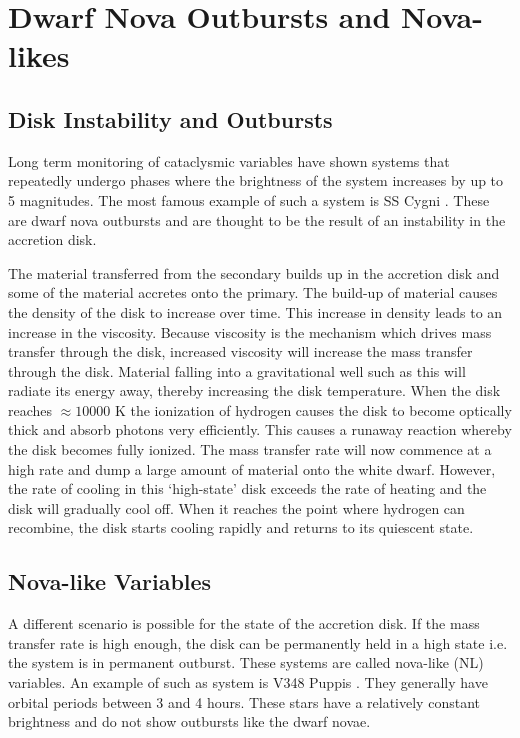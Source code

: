 \section{Dwarf Nova Outbursts and Nova-likes }

\subsection{Disk Instability and Outbursts}

Long term monitoring of cataclysmic variables have shown systems that repeatedly undergo phases where the brightness of the system increases by up to 5 magnitudes. The most famous example of such a system is SS Cygni \citep{SSCyg}. These are dwarf nova outbursts and are thought to be the result of an instability in the accretion disk. 

The material transferred from the secondary builds up in the accretion disk and some of the material accretes onto the primary. The build-up of material causes the density of the disk to increase over time. This increase in density leads to an increase in the viscosity. Because viscosity is the mechanism which drives mass transfer through the disk, increased viscosity will increase the mass transfer through the disk. Material falling into a gravitational well such as this will radiate its energy away, thereby increasing the disk temperature. When the disk reaches $\approx 10000$ K the ionization of hydrogen causes the disk to become optically thick and absorb photons very efficiently. This causes a runaway reaction whereby the disk becomes fully ionized. The mass transfer rate will now commence at a high rate and dump a large amount of material onto the white dwarf. However, the rate of cooling in this `high-state' disk exceeds the rate of heating and the disk will gradually cool off. When it reaches the point where hydrogen can recombine, the disk starts cooling rapidly and returns to its quiescent state. 



\subsection{Nova-like Variables}
\label{novalikes}

A different scenario is possible for the state of the accretion disk. If the mass transfer rate is high enough, the disk can be permanently held in a high state i.e. the system is in permanent outburst. These systems are called nova-like (NL) variables. An example of such as system is V348 Puppis \citep{v348pup}. They generally have orbital periods between 3 and 4 hours. These stars have a relatively constant brightness and do not show outbursts like the dwarf novae.

